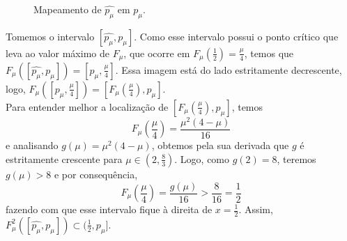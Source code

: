 \documentclass[../IC.tex]{subfiles}
\begin{document}
\begin{prova}
\begin{figure}[H]
			\caption{Mapeamento de $\hat{p_\mu}$ em $p_\mu$.}
			\label{pEmP}
		\end{figure}
		
		Tomemos o intervalo $[\hat{p_\mu}, p_\mu]$. Como esse intervalo possui o ponto crítico que leva ao valor máximo de $F_\mu$, que ocorre em $F_\mu(\frac{1}{2}) = \frac{\mu}{4}$, temos que 
		$F_\mu([\hat{p_\mu}, p_\mu]) = [p_\mu, \frac{\mu}{4}]$. Essa imagem está do lado estritamente decrescente, logo, $F_\mu([p_\mu, \frac{\mu}{4}]) = [F_\mu(\frac{\mu}{4}), p_\mu]$.\\
		Para entender melhor a localização de $[F_\mu(\frac{\mu}{4}), p_\mu]$, temos
		$$F_\mu\left(\dfrac{\mu}{4}\right) = \dfrac{\mu^2(4-\mu)}{16}$$
		e analisando $g(\mu) = \mu^2(4-\mu)$, obtemos pela sua derivada que $g$ é estritamente crescente para $\mu \in (2, \frac{8}{3})$. Logo, como $g(2) = 8$, teremos $g(\mu) > 8$ e por consequência,
		$$F_\mu\left(\dfrac{\mu}{4}\right) = \dfrac{g(\mu)}{16} > \dfrac{8}{16} = \dfrac{1}{2}$$
		fazendo com que esse intervalo fique à direita de $x = \frac{1}{2}$. Assim, $F_\mu^2([\hat{p_\mu}, p_\mu]) \subset (\frac{1}{2}, p_\mu]$.
		

\end{prova}
\end{document}
